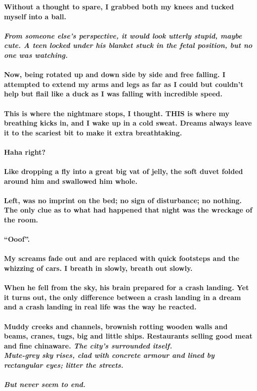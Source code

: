 \documentclass{book}
\begin{document}
\Large{\textbf{
	Without a thought to spare, I grabbed both my knees and tucked myself into a ball.\\\\
	\textit{From someone else's perspective,
		it would look utterly stupid, maybe cute.
		A teen locked under his blanket stuck in the fetal
	position, but no one was watching.}\\\\
	Now, being rotated up and down side by side and free falling.
	I attempted to extend my arms and legs as far as I could but couldn't
	help but flail like a duck as I was falling with incredible speed.\\\\
	This is where the nightmare stops, I thought.
	THIS is where my breathing kicks in, and I wake up in a cold sweat.
	Dreams always leave it to the scariest bit to make it extra
	breathtaking.\\\\
	Haha right?\\\\
	Like dropping a fly into a great big vat of jelly,
	the soft duvet folded around him and swallowed him whole.\\\\
	Left, was no imprint on the bed; no sign of disturbance; no nothing.
	The only clue as to what had happened that night was the wreckage of the room.\\\\
	``Ooof''.\\\\
	My screams fade out and are replaced with quick footsteps and the
	whizzing of cars. I breath in slowly, breath out slowly.\\\\
	When he fell from the sky, his brain prepared for a crash landing.
	Yet it turns out, the only difference between a crash landing in a dream
	and a crash landing in real life was the way he reacted.\\\\
    Muddy creeks and channels, brownish rotting wooden walls and beams, cranes, tugs, big and little ships.
	Restaurants selling good meat and fine chinaware.
	\textit{The city's surrounded itself.\\
		Mute-grey sky rises, clad with concrete armour
		and lined by rectangular eyes; litter the streets.\\\\
		But never seem to end.\\\\
}}}
\end{document}
